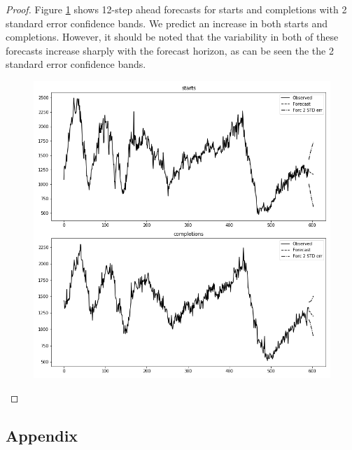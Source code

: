 \documentclass[oneside,reqno]{amsart}
\theoremstyle{definition}
\begin{document}
\begin{proof}
Figure \ref{forecast} shows 12-step ahead forecasts for starts and completions with 2 standard error confidence bands. We predict an increase in both starts and completions. However, it should be noted that the variability in both of these forecasts increase sharply with the forecast horizon, as can be seen the the 2 standard error confidence bands. 
\begin{figure}
\includegraphics[width=\textwidth]{forecast}
\caption{}
\label{forecast}
\end{figure}
\end{proof}


\subsection*{Appendix}
\end{document}
